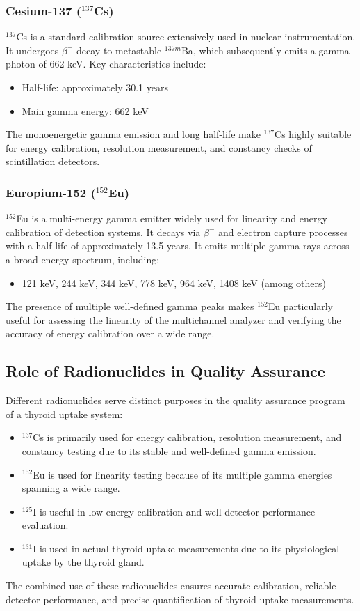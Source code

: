 \subsubsection{Cesium-137 ($^{137}$Cs)}
$^{137}$Cs is a standard calibration source extensively used in nuclear instrumentation. It undergoes $\beta^-$ decay to metastable $^{137m}$Ba, which subsequently emits a gamma photon of 662 keV.
Key characteristics include:
\begin{itemize}
    \item Half-life: approximately 30.1 years
    \item Main gamma energy: 662 keV
\end{itemize}
The monoenergetic gamma emission and long half-life make $^{137}$Cs highly suitable for energy calibration, resolution measurement, and constancy checks of scintillation detectors.

\subsubsection{Europium-152 ($^{152}$Eu)}
$^{152}$Eu is a multi-energy gamma emitter widely used for linearity and energy calibration of detection systems. It decays via $\beta^-$ and electron capture processes with a half-life of approximately 13.5 years.
It emits multiple gamma rays across a broad energy spectrum, including:
\begin{itemize}
    \item 121 keV, 244 keV, 344 keV, 778 keV, 964 keV, 1408 keV (among others)
\end{itemize}
The presence of multiple well-defined gamma peaks makes $^{152}$Eu particularly useful for assessing the linearity of the multichannel analyzer and verifying the accuracy of energy calibration over a wide range.

\subsection{Role of Radionuclides in Quality Assurance}
Different radionuclides serve distinct purposes in the quality assurance program of a thyroid uptake system:
\begin{itemize}
    \item $^{137}$Cs is primarily used for energy calibration, resolution measurement, and constancy testing due to its stable and well-defined gamma emission.
    \item $^{152}$Eu is used for linearity testing because of its multiple gamma energies spanning a wide range.
    \item $^{125}$I is useful in low-energy calibration and well detector performance evaluation.
    \item $^{131}$I is used in actual thyroid uptake measurements due to its physiological uptake by the thyroid gland.
\end{itemize}
The combined use of these radionuclides ensures accurate calibration, reliable detector performance, and precise quantification of thyroid uptake measurements.

